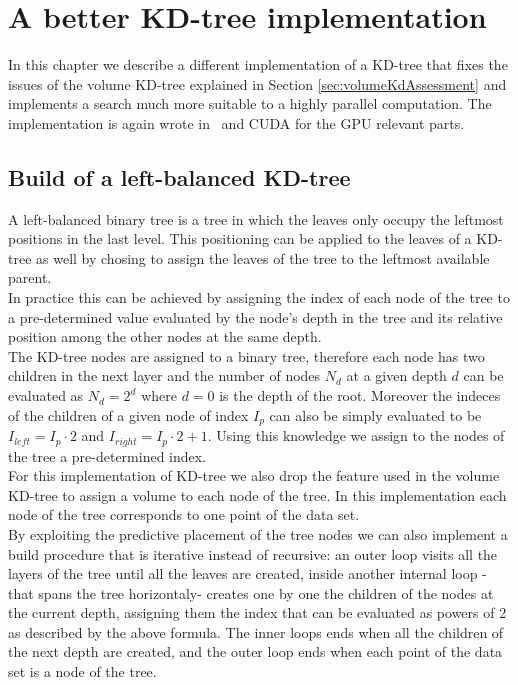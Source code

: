 \chapter{A better KD-tree implementation}\label{ch:fkdtree}
In this chapter we describe a different implementation of a KD-tree that fixes the issues of the volume KD-tree explained in Section \ref{sec:volumeKdAssessment} and implements a search much more suitable to a highly parallel computation. The implementation is again wrote in \CC\ and CUDA for the GPU relevant parts.

\section{Build of a left-balanced KD-tree}
A left-balanced binary tree is a tree in which the leaves only occupy the leftmost positions in the last level. This positioning can be applied to the leaves of a KD-tree as well by chosing to assign the leaves of the tree to the leftmost available parent.\\
In practice this can be achieved by assigning the index of each node of the tree to a pre-determined value evaluated by the node's depth in the tree and its relative position among the other nodes at the same depth.\\
The KD-tree nodes are assigned to a binary tree, therefore each node has two children in the next layer and the number of nodes $N_d$ at a given depth $d$ can be evaluated as $N_d = 2^d$ where $d = 0$ is the depth of the root. Moreover the indeces of the children of a given node of index $I_p$ can also be simply evaluated to be $I_{left} = I_p \cdot 2$ and $I_{right} = I_p \cdot 2 + 1$. Using this knowledge we assign to the nodes of the tree a pre-determined index.\\
For this implementation of KD-tree we also drop the feature used in the volume KD-tree to assign a volume to each node of the tree. In this implementation each node of the tree corresponds to one point of the data set.\\
By exploiting the predictive placement of the tree nodes we can also implement a build procedure that is iterative instead of recursive: an outer loop visits all the layers of the tree until all the leaves are created, inside another internal loop -that spans the tree horizontaly- creates one by one the children of the nodes at the current depth, assigning them the index that can be evaluated as powers of 2 as described by the above formula. The inner loops ends when all the children of the next depth are created, and the outer loop ends when each point of the data set is a node of the tree.\\
